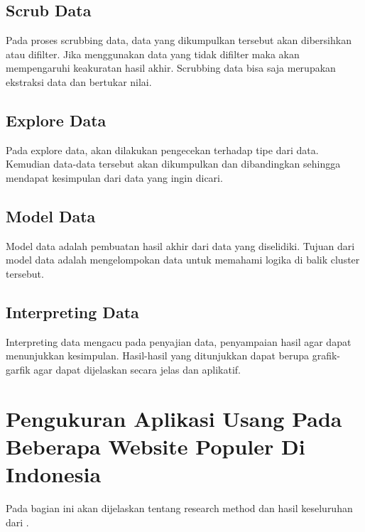 \subsection{Scrub Data}
Pada proses scrubbing data, data yang dikumpulkan tersebut akan dibersihkan atau difilter. Jika menggunakan data yang tidak difilter maka akan mempengaruhi keakuratan hasil akhir. Scrubbing data bisa saja merupakan ekstraksi data dan bertukar nilai.

\subsection{Explore Data}
Pada explore data, akan dilakukan pengecekan terhadap tipe dari data. Kemudian data-data tersebut akan dikumpulkan dan dibandingkan sehingga mendapat kesimpulan dari data yang ingin dicari. 

\subsection{Model Data}
Model data adalah pembuatan hasil akhir dari data yang diselidiki. Tujuan dari model data adalah mengelompokan data untuk memahami logika di balik cluster tersebut. 

\subsection{Interpreting Data}
Interpreting data mengacu pada penyajian data, penyampaian hasil agar dapat menunjukkan kesimpulan. Hasil-hasil yang ditunjukkan dapat berupa grafik-garfik agar dapat dijelaskan secara jelas dan aplikatif.




\section{Pengukuran Aplikasi Usang Pada Beberapa Website Populer Di Indonesia\cite{pascal}}
Pada bagian ini akan dijelaskan tentang research method dan hasil keseluruhan dari \cite{pascal}.
